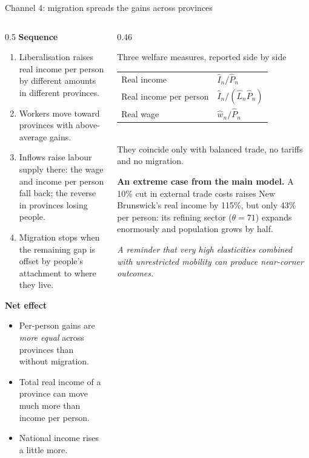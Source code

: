 \documentclass[aspectratio=169,9pt,t]{beamer}
\newcommand{\h}[1]{\hat{#1}}
\newcommand{\plain}[1]{{\color{ipgrey}\small\itshape #1}}
\begin{document}
\begin{frame}{Channel 4: migration spreads the gains across provinces}
  \begin{columns}[T]
    \begin{column}{0.5\textwidth}
      \textbf{Sequence}
      \begin{enumerate}
        \item Liberalisation raises real income per person by different
              amounts in different provinces.
        \item Workers move toward provinces with above-average gains.
        \item Inflows raise labour supply there: the wage and income per
              person fall back; the reverse in provinces losing people.
        \item Migration stops when the remaining gap is offset by
              people's attachment to where they live.
      \end{enumerate}
      \medskip
      \textbf{Net effect}
      \begin{itemize}
        \item Per-person gains are \emph{more equal} across provinces
              than without migration.
        \item Total real income of a province can move much more than
              income per person.
        \item National income rises a little more.
      \end{itemize}
    \end{column}
    \begin{column}{0.46\textwidth}
      \begin{block}{Three welfare measures, reported side by side}
        \small
        \begin{tabular}{@{}ll@{}}
          Real income & $\h I_n/\h P_n$\\[0.2em]
          Real income per person & $\h I_n/(\h L_n\h P_n)$\\[0.2em]
          Real wage & $\h w_n/\h P_n$\\
        \end{tabular}\\[0.5em]
        They coincide only with balanced trade, no tariffs and no
        migration.
      \end{block}
      \small
      \textbf{An extreme case from the main model.} A 10\% cut in external
      trade costs raises New Brunswick's real income by 115\%, but only
      43\% per person: its refining sector ($\theta=71$) expands
      enormously and population grows by half.

      \smallskip
      \plain{A reminder that very high elasticities combined with
      unrestricted mobility can produce near-corner outcomes.}
    \end{column}
  \end{columns}
\end{frame}
\end{document}
